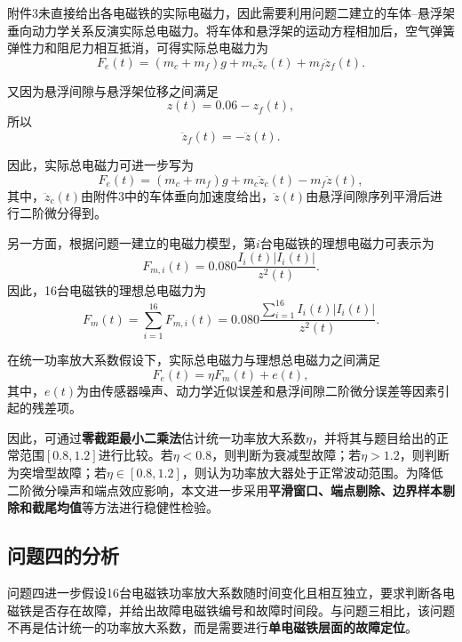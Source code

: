 \documentclass[a4paper]{nmmcm}
\begin{document}
附件3未直接给出各电磁铁的实际电磁力，因此需要利用问题二建立的车体--悬浮架垂向动力学关系反演实际总电磁力。将车体和悬浮架的运动方程相加后，空气弹簧弹性力和阻尼力相互抵消，可得实际总电磁力为
\begin{equation}
F_e(t)=(m_c+m_f)g+m_c\ddot{z}_c(t)+m_f\ddot{z}_f(t).
\end{equation}

又因为悬浮间隙与悬浮架位移之间满足
\begin{equation}
z(t)=0.06-z_f(t),
\end{equation}
所以
\begin{equation}
\ddot{z}_f(t)=-\ddot{z}(t).
\end{equation}

因此，实际总电磁力可进一步写为
\begin{equation}
F_e(t)=(m_c+m_f)g+m_c\ddot{z}_c(t)-m_f\ddot{z}(t),
\end{equation}
其中，$\ddot{z}_c(t)$由附件3中的车体垂向加速度给出，$\ddot{z}(t)$由悬浮间隙序列平滑后进行二阶微分得到。

另一方面，根据问题一建立的电磁力模型，第$i$台电磁铁的理想电磁力可表示为
\begin{equation}
F_{m,i}(t)=0.080\frac{I_i(t)|I_i(t)|}{z^2(t)}.
\end{equation}
因此，16台电磁铁的理想总电磁力为
\begin{equation}
F_m(t)=\sum_{i=1}^{16}F_{m,i}(t)
=0.080\frac{\sum_{i=1}^{16}I_i(t)|I_i(t)|}{z^2(t)}.
\end{equation}

在统一功率放大系数假设下，实际总电磁力与理想总电磁力之间满足
\begin{equation}
F_e(t)=\eta F_m(t)+e(t),
\end{equation}
其中，$e(t)$为由传感器噪声、动力学近似误差和悬浮间隙二阶微分误差等因素引起的残差项。

因此，可通过\textbf{零截距最小二乘法}估计统一功率放大系数$\eta$，并将其与题目给出的正常范围$[0.8,1.2]$进行比较。若$\eta<0.8$，则判断为衰减型故障；若$\eta>1.2$，则判断为突增型故障；若$\eta\in[0.8,1.2]$，则认为功率放大器处于正常波动范围。为降低二阶微分噪声和端点效应影响，本文进一步采用\textbf{平滑窗口、端点剔除、边界样本剔除和截尾均值}等方法进行稳健性检验。

\subsection{问题四的分析}

问题四进一步假设16台电磁铁功率放大系数随时间变化且相互独立，要求判断各电磁铁是否存在故障，并给出故障电磁铁编号和故障时间段。与问题三相比，该问题不再是估计统一的功率放大系数，而是需要进行\textbf{单电磁铁层面的故障定位}。
\end{document}
